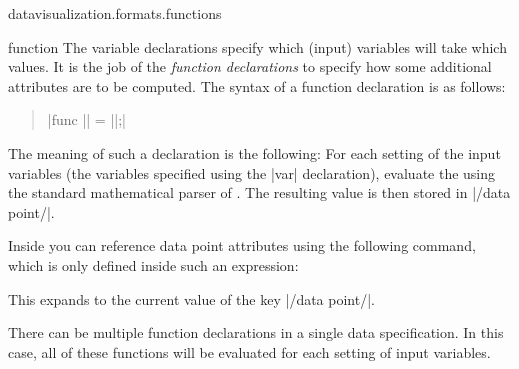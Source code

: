 \begin{tikzlibrary}{datavisualization.formats.functions}
\begin{dataformat}{function}
    The variable declarations specify which (input) variables will
    take which values. It is the job of the \emph{function
      declarations} to specify how some additional attributes are to
    be computed. The syntax of a function declaration is as follows:
    \begin{quote}
      |func || = ||;|
    \end{quote}
    The meaning of such a declaration is the following: For each
    setting of the input variables (the variables specified using the
    |var| declaration), evaluate the  using the
    standard mathematical parser of \tikzname. The resulting value is
    then stored in |/data point/|.

    Inside  you can reference data point attributes
    using the following command, which is only defined inside such an
    expression:
    \begin{command}{\value{}}
      This expands to the current value of the key |/data point/|.
    \end{command}

    There can be multiple function declarations in a single data
    specification. In this case, all of these functions will be
    evaluated for each setting of input variables.

    \begin{codeexample}[]
    \end{codeexample}
    \begin{codeexample}[]
    \end{codeexample}
  \end{dataformat}
  
\end{tikzlibrary}



